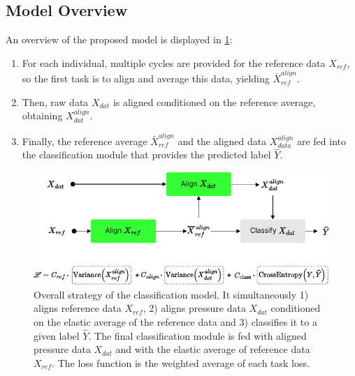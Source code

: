 \subsection{Model Overview}
An overview of the proposed model is displayed in \cref{fig:phm_method2}:
\begin{enumerate}
    \item For each individual, multiple cycles are provided for the reference data $X_{ref}$, so the first task is to align and average this data, yielding $\bar{X}_{ref}^{align}$. 
    \item Then, raw data $X_{dat}$ is aligned conditioned on the reference average, obtaining $X_{dat}^{align}$. 
    \item Finally, the reference average $\bar{X}_{ref}^{align}$ and the aligned data $X_{data}^{align}$ are fed into the classification module that provides the predicted label $\hat{Y}$.
\end{enumerate}
\begin{figure}[b]
    \begin{center}
    \centerline{\includegraphics[width=\linewidth,trim=10 51 0 0,clip]{figures/phm4.pdf}}
    \caption{Overall strategy of the classification model. It simultaneously 1) aligns reference data $X_{ref}$, 2) aligns pressure data $X_{dat}$ conditioned on the elastic average of the reference data and 3) classifies it to a given label $\hat{Y}$. 
    The final classification module is fed with aligned pressure data $X_{dat}$ and with the elastic average of reference data $X_{ref}$.
    The loss function is the weighted average of each task loss.}
    \label{fig:phm_method2}
    \end{center}
    \vspace{-2em}
\end{figure}


